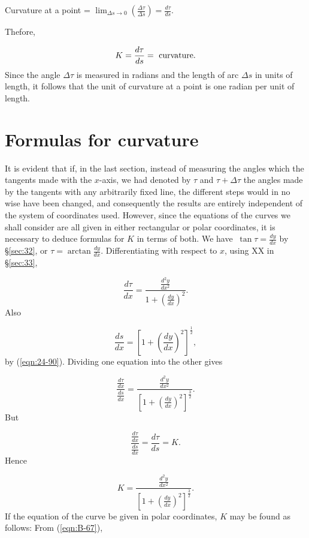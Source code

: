 \begin{center}
Curvature at a point = 
$\lim_{\Delta s \to 0} \left( \frac{\Delta \tau}{\Delta s} \right) 
= \frac{d\tau}{ds}$.
\end{center}
Thefore,

\begin{equation}
K = \frac{d\tau}{ds} = \ {\rm curvature}.
\label{eqn:101-39}
\end{equation}
Since the angle $\Delta \tau$ is measured in radians and 
the length of arc $\Delta s$ in units of length, 
it follows that the unit of curvature at a point is one 
radian per unit of length.

\section{Formulas for curvature}
\label{sec:102}

It is evident that if, in the last section, instead 
of measuring the angles which the tangents made with 
the $x$-axis, we had denoted by $\tau$ and 
$\tau + \Delta \tau$ the angles made by the tangents with 
any arbitrarily fixed line, the different steps would 
in no wise have been changed, and consequently the results 
are entirely independent of the system of coordinates 
used. However, since the equations of the curves we 
shall consider are all given in either rectangular 
or polar coordinates, it is necessary to deduce 
formulas for $K$ in terms of both. We have
$\ \tan \tau 	= \frac{dy}{dx}$ by \S \ref{sec:32}, %
or $\tau = \arctan \frac{dy}{dx}$.
Differentiating with respect to $x$, using XX in \S \ref{sec:33},

\[
\frac{d\tau}{dx} 	
= \frac{ \frac{d^2 y}{dx^2} }{ 1 + \left( \frac{dy}{dx} \right)^2 }. 
\]
Also

\[
\frac{ds}{dx} 	
= \left[ 1 + \left( \frac{dy}{dx} \right)^2 \right]^{\frac{1}{2}},
\]
by (\ref{eqn:24-90}). %
Dividing one equation into the other %
gives

\[
\frac{ \frac{d\tau}{dx} }{ \frac{ds}{dx} } 	
= \frac{ \frac{d^2 y}{dx^2} }{ \left[ 1 
+ \left( \frac{dy}{dx} \right)^2 \right]^{\frac{3}{2}} }.
\]
But 	

\[
\frac{ \frac{d\tau}{dx} }{ \frac{ds}{dx} } 	
= \frac{d\tau}{ds} = K. 
\]
Hence

\begin{equation}
K 	
= \frac{ \frac{d^2 y}{dx^2} }{ \left[ 1 
+ \left( \frac{dy}{dx} \right)^2 \right]^{\frac{3}{2}} }.
\label{eqn:102-40}
\end{equation}
If the equation of the curve be given in polar 
coordinates, $K$ may be found as follows:
From (\ref{eqn:B-67}), %

